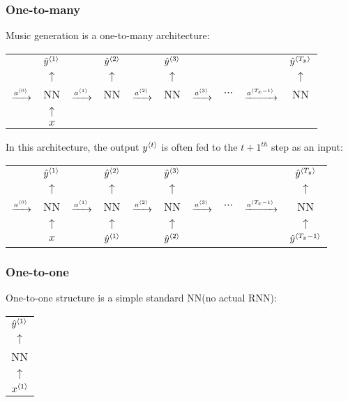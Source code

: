 \subsubsection{One-to-many}
Music generation is a one-to-many architecture:
\begin{center}
  \begin{tabular}{cccccccccc}
    & $\hat{y}^{\left\langle 1\right\rangle}$ & & $\hat{y}^{\left\langle 2\right\rangle}$ & & $\hat{y}^{\left\langle 3\right\rangle}$ & & & & $\hat{y}^{\left\langle T_y\right\rangle}$\\
    & $\uparrow$ & & $\uparrow$ & & $\uparrow$ & & & & $\uparrow$\\ 
    $\xrightarrow{a^{\left\langle 0\right\rangle}}$& NN & $\xrightarrow{a^{\left\langle 1\right\rangle}}$ & NN & $\xrightarrow{a^{\left\langle 2\right\rangle}}$ & NN & $\xrightarrow{a^{\left\langle 3\right\rangle}}$ & $\cdots$ & $\xrightarrow{a^{\left\langle T_x-1\right\rangle}}$ & NN \\ 
    & $\uparrow$ \\ 
    & $x$ \\
  \end{tabular}
\end{center}
In this architecture, the output $y^{\left\langle t\right\rangle}$ is often fed to the $t+1^{th}$ step as an input:
\begin{center}
  \begin{tabular}{cccccccccc}
    & $\hat{y}^{\left\langle 1\right\rangle}$ & & $\hat{y}^{\left\langle 2\right\rangle}$ & & $\hat{y}^{\left\langle 3\right\rangle}$ & & & & $\hat{y}^{\left\langle T_y\right\rangle}$\\
    & $\uparrow$ & & $\uparrow$ & & $\uparrow$ & & & & $\uparrow$\\ 
    $\xrightarrow{a^{\left\langle 0\right\rangle}}$& NN & $\xrightarrow{a^{\left\langle 1\right\rangle}}$ & NN & $\xrightarrow{a^{\left\langle 2\right\rangle}}$ & NN & $\xrightarrow{a^{\left\langle 3\right\rangle}}$ & $\cdots$ & $\xrightarrow{a^{\left\langle T_x-1\right\rangle}}$ & NN \\ 
    & $\uparrow$ & & $\uparrow$ & & $\uparrow$ & & & & $\uparrow$\\ 
    & $x$ & & \color{red}$\hat{y}^{\left\langle 1\right\rangle}$ & & \color{red}$\hat{y}^{\left\langle 2\right\rangle}$ & & & & \color{red}$\hat{y}^{\left\langle T_y-1\right\rangle}$\\
  \end{tabular}
\end{center}
\subsubsection{One-to-one}
One-to-one structure is a simple standard NN(no actual RNN):
\begin{center}
  \begin{tabular}{c}
    $\hat{y}^{\left\langle 1\right\rangle}$\\
    $\uparrow$\\ 
    NN\\
    $\uparrow$\\ 
    $x^{\left\langle 1\right\rangle}$ 
  \end{tabular}
\end{center}
